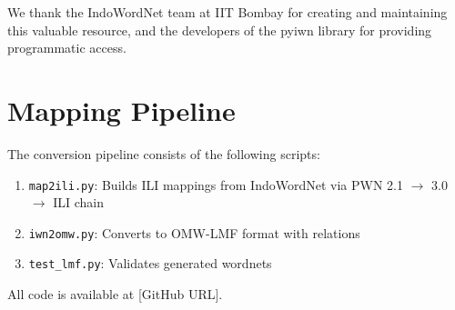 \documentclass[11pt]{article}
\begin{document}
We thank the IndoWordNet team at IIT Bombay for creating and maintaining this valuable resource, and the developers of the pyiwn library for providing programmatic access.




\appendix

\section{Mapping Pipeline}

The conversion pipeline consists of the following scripts:
\begin{enumerate}
\item \texttt{map2ili.py}: Builds ILI mappings from IndoWordNet via PWN 2.1 $\rightarrow$ 3.0 $\rightarrow$ ILI chain
\item \texttt{iwn2omw.py}: Converts to OMW-LMF format with relations
\item \texttt{test\_lmf.py}: Validates generated wordnets
\end{enumerate}

All code is available at [GitHub URL].
\end{document}
